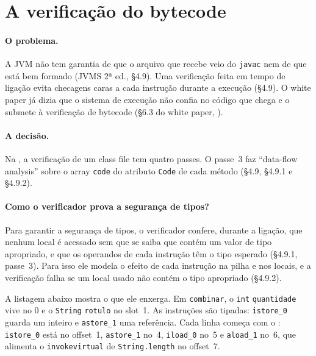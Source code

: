 \section{A verificação do bytecode}
\label{sec:verificacao}

\paragraph{O problema.}
A JVM não tem garantia de que o arquivo que
recebe veio do \texttt{javac} nem de que está bem formado (JVMS 2ª ed.,
§4.9). Uma verificação feita em tempo de ligação evita checagens caras a
cada instrução durante a execução (§4.9). O white paper já dizia que o
sistema de execução não confia no código que chega e o submete à
verificação de bytecode (§6.3 do white paper,
).

\paragraph{A decisão.}
Na , a verificação de um
class file tem quatro passes. O passe~3 faz \enquote{data-flow analysis}
sobre o array \texttt{code} do atributo \texttt{Code} de cada método
(§4.9, §4.9.1 e §4.9.2).

\paragraph{Como o verificador prova a segurança de tipos?}
Para garantir a segurança de tipos, o verificador confere, durante a
ligação, que nenhum local é acessado sem que se saiba que contém um
valor de tipo apropriado, e que os operandos de cada instrução têm o
tipo esperado (§4.9.1, passe~3). Para isso ele modela o efeito de cada
instrução na pilha e nos locais, e a verificação falha se um local
usado não contém o tipo apropriado (§4.9.2).

A listagem abaixo mostra o que ele enxerga. Em \texttt{combinar}, o
\texttt{int} \texttt{quantidade} vive no  0 e o \texttt{String}
\texttt{rotulo} no slot~1. As instruções são tipadas:
\texttt{istore\_0} guarda um inteiro e \texttt{astore\_1} uma
referência. Cada linha começa com o : \texttt{istore\_0} está no
offset~1, \texttt{astore\_1} no~4, \texttt{iload\_0} no~5 e
\texttt{aload\_1} no~6, que alimenta o \texttt{invokevirtual} de
\texttt{String.length} no offset~7.

